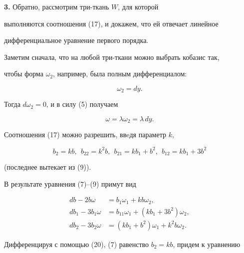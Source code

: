 \medskip 


 


{\bf 3.} Обратно, рассмотрим три-ткань $W$, для которой 


выполняются соотношения (17), и докажем, что ей отвечает линейное 


дифференциальное уравнение первого порядка. 


 


Заметим сначала, что на любой три-ткани можно выбрать кобазис так, 


чтобы форма $\omega_2$, например, была полным дифференциалом:


\begin{equation} 


\omega_2=dy. 


\end{equation} 


Тогда $d\omega_2=0$, и в силу (5) получаем 


\begin{equation} 


\omega=\lambda\omega_2=\lambda\,dy. 


\end{equation} 


Соотношения (17) можно разрешить, ввeдя параметр $k$, 


\begin{equation} 


b_2=k b,\ \ b_{22}=k^2b,\ \ b_{21}=k b_1+b^2, 


\ \ b_{12}=k b_1+3b^2 


\end{equation} 


(последнее вытекает из (9)). 


 


В результате уравнения (7)--(9) примут вид 


\begin{align*} 


db-2b\omega&=b_1\omega_1+k b\omega_2,\\ 


db_1-3b_1\omega&=b_{11}\omega_1+(k b_1+3b^2)\omega_2,\\ 


db_2-3b_2\omega&=(k b_1+b^2)\omega_1+k^2b\omega_2. 


\end{align*} 


Дифференцируя с помощью (20), (7) равенство $b_2=k b$, придем к уравнению 


